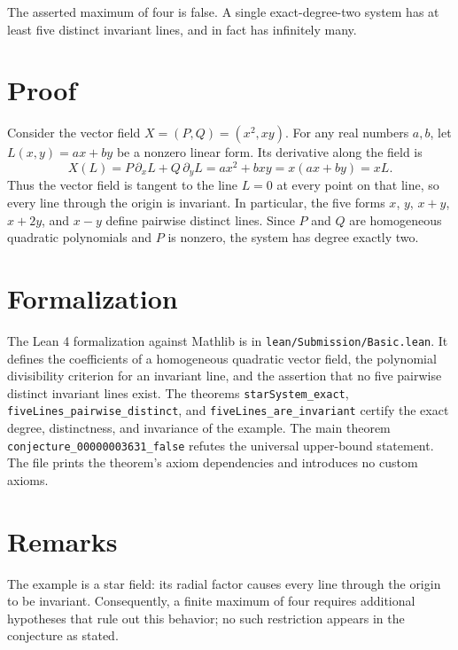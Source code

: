 \documentclass[11pt]{article}
\theoremstyle{plain}
\theoremstyle{definition}
\theoremstyle{remark}
\begin{document}

The asserted maximum of four is false. A single exact-degree-two system has at least five distinct invariant lines, and in fact has infinitely many.

\section{Proof}

Consider the vector field $X=(P,Q)=(x^2,xy)$. For any real numbers $a,b$, let $L(x,y)=ax+by$ be a nonzero linear form. Its derivative along the field is
\[
X(L)=P\,\partial_x L+Q\,\partial_y L=ax^2+bxy=x(ax+by)=xL.
\]
Thus the vector field is tangent to the line $L=0$ at every point on that line, so every line through the origin is invariant. In particular, the five forms $x$, $y$, $x+y$, $x+2y$, and $x-y$ define pairwise distinct lines. Since $P$ and $Q$ are homogeneous quadratic polynomials and $P$ is nonzero, the system has degree exactly two.

\section{Formalization}

The Lean 4 formalization against Mathlib is in \verb|lean/Submission/Basic.lean|. It defines the coefficients of a homogeneous quadratic vector field, the polynomial divisibility criterion for an invariant line, and the assertion that no five pairwise distinct invariant lines exist. The theorems \verb|starSystem_exact|, \verb|fiveLines_pairwise_distinct|, and \verb|fiveLines_are_invariant| certify the exact degree, distinctness, and invariance of the example. The main theorem \verb|conjecture_00000003631_false| refutes the universal upper-bound statement. The file prints the theorem's axiom dependencies and introduces no custom axioms.

\section{Remarks}


The example is a star field: its radial factor causes every line through the origin to be invariant. Consequently, a finite maximum of four requires additional hypotheses that rule out this behavior; no such restriction appears in the conjecture as stated.
\end{document}
